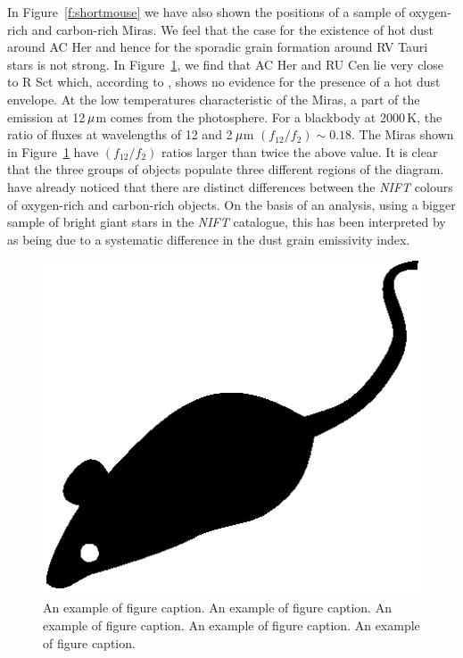 \documentclass[useAMS,usenatbib]{biom}
\begin{document}
In Figure~\ref{f:shortmouse} we have also shown the positions of a
sample of oxygen-rich and carbon-rich Miras.  We feel that the case
for the existence of hot dust around AC Her and hence for the sporadic
grain formation around RV Tauri stars is not strong. In
Figure~\ref{f:bigmouse}, we find that AC Her and RU Cen lie very close
to R Sct which, according to \citet{b9}, shows no evidence for the
presence of a hot dust envelope. At the low temperatures
characteristic of the Miras, a part of the emission at 12$\,\mu$m
comes from the photosphere.  For a blackbody at 2000$\,$K, the ratio
of fluxes at wavelengths of 12 and 2$\,\mu$m $(f_{12}/f_{2})\sim
0.18$. The Miras shown in Figure~\ref{f:bigmouse} have
$(f_{12}/f_{2})$ ratios larger than twice the above value. It is clear
that the three groups of objects populate three different regions of
the diagram. \citet{b10} have already noticed that there are distinct
differences between the {\it NIFT\/} colours of oxygen-rich and
carbon-rich objects. On the basis of an analysis, using a bigger
sample of bright giant stars in the {\it NIFT\/} catalogue, this has
been interpreted by as being due to a systematic
difference in the dust grain emissivity index.

\begin{figure}
  \centerline{\includegraphics[width=4.5in]{mouse.eps}}
  \caption{An example of figure caption. An example of 
  figure caption. An example of figure caption. An example of
   figure caption. An example of figure caption.}
\label{f:bigmouse}
\end{figure}
\end{document}
